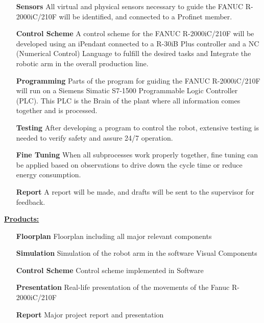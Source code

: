 \begin{itemize}[leftmargin=5cm]
	\item[\textbf{Sensors}] All virtual and physical sensors necessary to guide the FANUC R-2000iC/210F will be identified, and connected to a Profinet member.
	\item[\textbf{Control Scheme}] A control scheme for the FANUC R-2000iC/210F will be developed using an iPendant connected to a R-30iB Plus controller and a NC (Numerical Control) Language to fulfill the desired tasks and Integrate the robotic arm in the overall production line. 
	\item[\textbf{Programming}] Parts of the program for guiding the FANUC R-2000iC/210F will run on a Siemens Simatic S7-1500 Programmable Logic Controller (PLC). This PLC is the Brain of the plant where all information comes together and is processed.
	\item[\textbf{Testing}] After developing a program to control the robot, extensive testing is needed to verify safety and assure 24/7 operation.
	\item[\textbf{Fine Tuning}] When all subprocesses work properly together, fine tuning can be applied based on observations to drive down the cycle time or reduce energy consumption.
	\item[\textbf{Report}] A report will be made, and drafts will be sent to the supervisor for feedback. 
\end{itemize}
\bigskip
\underline{\textbf{Products:}}\vspace{2mm}
\begin{itemize}[leftmargin=5cm]
	\item[\textbf{Floorplan}] Floorplan including all major relevant components
	\item[\textbf{Simulation}] Simulation of the robot arm in the software Visual Components
	\item[\textbf{Control Scheme}] Control scheme implemented in Software 
	\item[\textbf{Presentation}] Real-life presentation of the movements of the Fanuc R-2000iC/210F
	\item[\textbf{Report}] Major project report and presentation
\end{itemize}
%
